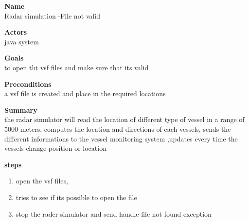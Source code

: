 \noindent
{\bf Name}\\
Radar simulation -File not valid 

\noindent
{\bf Actors}\\
java system 

\noindent
{\bf Goals}\\
to open tht vsf files and make sure that its valid 

\noindent
{\bf Preconditions }\\
a vsf  file is created and place in the required locations 


\noindent
{\bf Summary }\\
the radar simulator will read the location of different type of vessel in a range of 5000 meters,
computes the location and directions of each vessels, 
sends the different informations to the vessel monitoring system ,updates every time the vessels  
change position or location

\noindent
{\bf steps }\\
\begin{enumerate}
\item open the vsf files, 
\item tries to see if its possible to open the file 
\item stop the rader simulator and send handle file not found exception 
\end{enumerate} 
